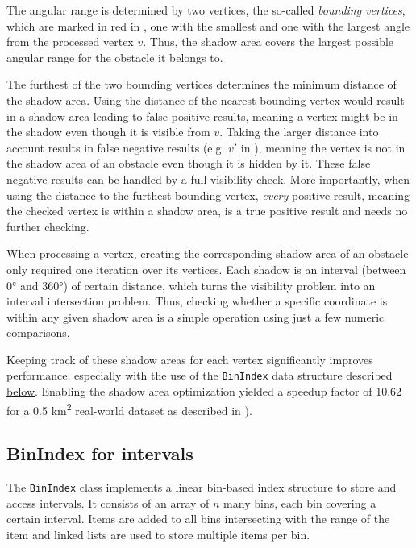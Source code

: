 		The angular range is determined by two vertices, the so-called \emph{bounding vertices}, which are marked in red in , one with the smallest and one with the largest angle from the processed vertex $v$.
		Thus, the shadow area covers the largest possible angular range for the obstacle it belongs to.
		
		The furthest of the two bounding vertices determines the minimum distance of the shadow area.
		Using the distance of the nearest bounding vertex would result in a shadow area leading to false positive results, meaning a vertex might be in the shadow even though it is visible from $v$.
		Taking the larger distance into account results in false negative results (e.g. $v'$ in ), meaning the vertex is not in the shadow area of an obstacle even though it is hidden by it.
		These false negative results can be handled by a full visibility check.
		More importantly, when using the distance to the furthest bounding vertex, \emph{every} positive result, meaning the checked vertex is within a shadow area, is a true positive result and needs no further checking.
		
		When processing a vertex, creating the corresponding shadow area of an obstacle only required one iteration over its vertices.
		Each shadow is an interval (between 0° and 360°) of certain distance, which turns the visibility problem into an interval intersection problem.
		Thus, checking whether a specific coordinate is within any given shadow area is a simple operation using just a few numeric comparisons.
		
		Keeping track of these shadow areas for each vertex significantly improves performance, especially with the use of the \texttt{BinIndex} data structure described \hyperref[subsec:binindex]{below}.
		Enabling the shadow area optimization yielded a speedup factor of 10.62 for a 0.5 km\textsuperscript{2} real-world dataset as described in ).

	\subsection{BinIndex for intervals}
	\label{subsec:binindex}
	
		The \texttt{BinIndex} class implements a linear bin-based index structure to store and access intervals.
		It consists of an array of $n$ many bins, each bin covering a certain interval.
		Items are added to all bins intersecting with the range of the item and linked lists are used to store multiple items per bin.
	
